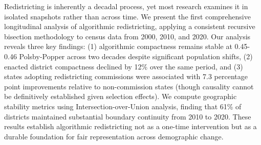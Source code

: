 Redistricting is inherently a decadal process, yet most research examines it in isolated snapshots rather than across time. We present the first comprehensive longitudinal analysis of algorithmic redistricting, applying a consistent recursive bisection methodology to census data from 2000, 2010, and 2020. Our analysis reveals three key findings: (1) algorithmic compactness remains stable at 0.45-0.46 Polsby-Popper across two decades despite significant population shifts, (2) enacted district compactness declined by 12\% over the same period, and (3) states adopting redistricting commissions were associated with 7.3 percentage point improvements relative to non-commission states (though causality cannot be definitively established given selection effects). We compute geographic stability metrics using Intersection-over-Union analysis, finding that 61\% of districts maintained substantial boundary continuity from 2010 to 2020. These results establish algorithmic redistricting not as a one-time intervention but as a durable foundation for fair representation across demographic change.
